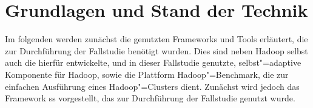 \chapter{Grundlagen und Stand der Technik}
\label{ch:basics}

Im folgenden werden zunächst die genutzten Frameworks und Tools erläutert, die zur Durchführung der Fallstudie benötigt wurden.
Dies sind neben Hadoop selbst auch die hierfür entwickelte, und in dieser Fallstudie genutzte, selbst"=adaptive Komponente für Hadoop, sowie die Plattform Hadoop"=Benchmark, die zur einfachen Ausführung eines Hadoop"=Clusters dient.
Zunächst wird jedoch das Framework \acrshort{ss} vorgestellt, das zur Durchführung der Fallstudie genutzt wurde.

%








